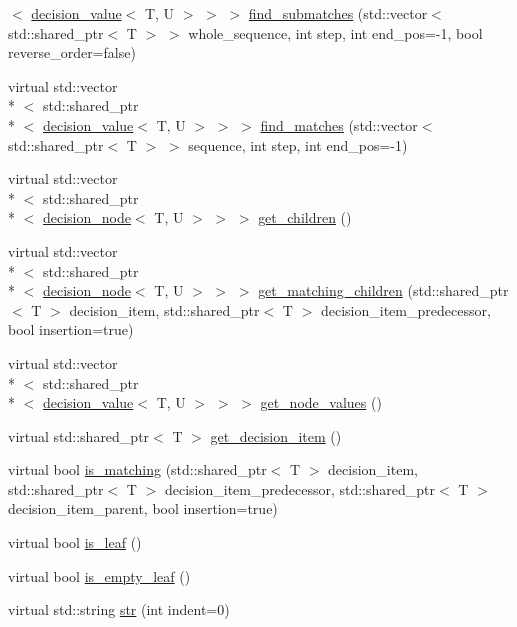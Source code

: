\begin{DoxyCompactItemize}
$<$ \hyperlink{classmae_1_1fl_1_1laban_1_1decision__value}{decision\-\_\-value}$<$ T, U $>$ $>$ $>$ \hyperlink{classmae_1_1fl_1_1laban_1_1decision__node_a2e5f1b884ef53720015574306a5a35fd}{find\-\_\-submatches} (std\-::vector$<$ std\-::shared\-\_\-ptr$<$ T $>$ $>$ whole\-\_\-sequence, int step, int end\-\_\-pos=-\/1, bool reverse\-\_\-order=false)
\item 
virtual std\-::vector\\*
$<$ std\-::shared\-\_\-ptr\\*
$<$ \hyperlink{classmae_1_1fl_1_1laban_1_1decision__value}{decision\-\_\-value}$<$ T, U $>$ $>$ $>$ \hyperlink{classmae_1_1fl_1_1laban_1_1decision__node_a4191db14a5546c5343801be0b10a7f89}{find\-\_\-matches} (std\-::vector$<$ std\-::shared\-\_\-ptr$<$ T $>$ $>$ sequence, int step, int end\-\_\-pos=-\/1)
\item 
virtual std\-::vector\\*
$<$ std\-::shared\-\_\-ptr\\*
$<$ \hyperlink{classmae_1_1fl_1_1laban_1_1decision__node}{decision\-\_\-node}$<$ T, U $>$ $>$ $>$ \hyperlink{classmae_1_1fl_1_1laban_1_1decision__node_adf2c8d508c5b53d20b23694aa1f073f8}{get\-\_\-children} ()
\item 
virtual std\-::vector\\*
$<$ std\-::shared\-\_\-ptr\\*
$<$ \hyperlink{classmae_1_1fl_1_1laban_1_1decision__node}{decision\-\_\-node}$<$ T, U $>$ $>$ $>$ \hyperlink{classmae_1_1fl_1_1laban_1_1decision__node_ab070bdac746f755afdf23fe27a31fc56}{get\-\_\-matching\-\_\-children} (std\-::shared\-\_\-ptr$<$ T $>$ decision\-\_\-item, std\-::shared\-\_\-ptr$<$ T $>$ decision\-\_\-item\-\_\-predecessor, bool insertion=true)
\item 
virtual std\-::vector\\*
$<$ std\-::shared\-\_\-ptr\\*
$<$ \hyperlink{classmae_1_1fl_1_1laban_1_1decision__value}{decision\-\_\-value}$<$ T, U $>$ $>$ $>$ \hyperlink{classmae_1_1fl_1_1laban_1_1decision__node_ae7b51e4b1114f047d2c71da4faf1a4e3}{get\-\_\-node\-\_\-values} ()
\item 
virtual std\-::shared\-\_\-ptr$<$ T $>$ \hyperlink{classmae_1_1fl_1_1laban_1_1decision__node_a97f2e0467c0a4bd87e7d5e1cd3bf46fa}{get\-\_\-decision\-\_\-item} ()
\item 
virtual bool \hyperlink{classmae_1_1fl_1_1laban_1_1decision__node_a20907ce96f941914870cb5c7163584f7}{is\-\_\-matching} (std\-::shared\-\_\-ptr$<$ T $>$ decision\-\_\-item, std\-::shared\-\_\-ptr$<$ T $>$ decision\-\_\-item\-\_\-predecessor, std\-::shared\-\_\-ptr$<$ T $>$ decision\-\_\-item\-\_\-parent, bool insertion=true)
\item 
virtual bool \hyperlink{classmae_1_1fl_1_1laban_1_1decision__node_aece2f8658b9343c0bf6f80f090e01fa1}{is\-\_\-leaf} ()
\item 
virtual bool \hyperlink{classmae_1_1fl_1_1laban_1_1decision__node_a0494692662dd5b545b9c5db0b8fa7087}{is\-\_\-empty\-\_\-leaf} ()
\item 
virtual std\-::string \hyperlink{classmae_1_1fl_1_1laban_1_1decision__node_a1fd4ff5b5b5d5b0dac4502626e31b1fd}{str} (int indent=0)
\end{DoxyCompactItemize}
